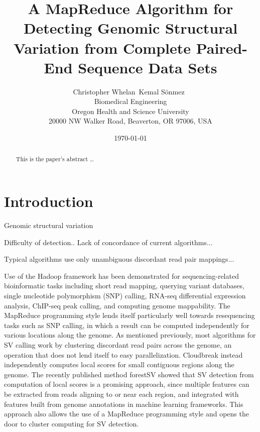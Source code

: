 \documentclass[12pt]{article}
\begin{document}
\title{A MapReduce Algorithm for Detecting Genomic Structural Variation from Complete Paired-End Sequence Data Sets}

\author{
Christopher Whelan\ Kemal S\"onmez\ \\
Biomedical Engineering \\
Oregon Health and Science University \\
20000 NW Walker Road, Beaverton, OR 97006, USA
}

\date{\today}

\maketitle

\begin{abstract}
This is the paper's abstract \ldots
\end{abstract}

\section{Introduction}

Genomic structural variation

Difficulty of detection.. Lack of concordance of current algorithms...

Typical algorithms use only unambiguous discordant read pair mappings...

Use of the Hadoop framework has been demonstrated for sequencing-related bioinformatic tasks including short read mapping, \cite{Schatz:2009p278} querying variant databases, \cite{Oconnor:2010p1835} single nucleotide polymorphism (SNP) calling, \cite{Langmead:2009p1225} RNA-seq differential expression analysis, \cite{Langmead:2010p1268} ChIP-seq peak calling, \cite{Feng:2011p1228} and computing genome mappability. \cite{Lee:2012bk} The MapReduce programming style lends itself particularly well towards resequencing tasks such as SNP calling, in which a result can be computed independently for various locations along the genome. As mentioned previously, most algorithms for SV calling work by clustering discordant read pairs across the genome, an operation that does not lend itself to easy parallelization. Cloudbreak instead independently computes local scores for small contiguous regions along the genome. The recently published method forestSV \cite{Michaelson:2012fj} showed that SV detection from computation of local scores is a promising approach, since multiple features can be extracted from reads aligning to or near each region, and integrated with features built from genome annotations in machine learning frameworks. This approach also allows the use of a MapReduce programming style and opens the door to cluster computing for SV detection.
\end{document}
